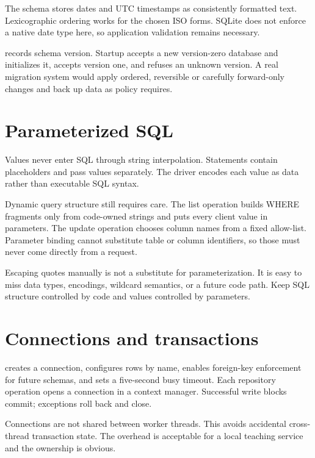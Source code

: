 The schema stores dates and UTC timestamps as consistently formatted text.
Lexicographic ordering works for the chosen ISO forms. SQLite does not enforce a
native date type here, so application validation remains necessary.

 records schema version. Startup accepts a new
version-zero database and initializes it, accepts version one, and refuses an
unknown version. A real migration system would apply ordered, reversible or
carefully forward-only changes and back up data as policy requires.

\section{Parameterized SQL}

Values never enter SQL through string interpolation. Statements contain
 placeholders and pass values separately. The driver encodes each value
as data rather than executable SQL syntax.

Dynamic query structure still requires care. The list operation builds WHERE
fragments only from code-owned strings and puts every client value in parameters.
The update operation chooses column names from a fixed allow-list. Parameter
binding cannot substitute table or column identifiers, so those must never come
directly from a request.

\begin{securityboundary}
Escaping quotes manually is not a substitute for parameterization. It is easy to
miss data types, encodings, wildcard semantics, or a future code path. Keep SQL
structure controlled by code and values controlled by parameters.
\end{securityboundary}

\section{Connections and transactions}

 creates a connection, configures rows by name, enables
foreign-key enforcement for future schemas, and sets a five-second busy timeout.
Each repository operation opens a connection in a context manager. Successful
write blocks commit; exceptions roll back and close.

Connections are not shared between worker threads. This avoids accidental
cross-thread transaction state. The overhead is acceptable for a local teaching
service and the ownership is obvious.

